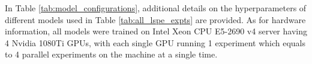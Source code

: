 \documentclass{article} \usepackage{iclr2021_conference,times}
\begin{document}
In Table \ref{tab:model_configurations}, additional details on the hyperparameters of different models used in Table \ref{tab:all_lspe_expts} are provided. As for hardware information, all models were trained on Intel Xeon CPU E5-2690 v4 server having 4 Nvidia 1080Ti GPUs, with each single GPU running 1 experiment which equals to 4 parallel experiments on the machine at a single time.

 
\end{document}
